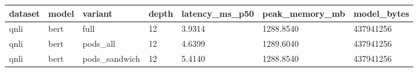 \begin{tabular}{lllllll}
\hline
dataset & model & variant & depth & latency\_ms\_p50 & peak\_memory\_mb & model\_bytes \\
\hline
qnli & bert & full & 12 & 3.9314 & 1288.8540 & 437941256 \\
qnli & bert & pods\_all & 12 & 4.6399 & 1289.6040 & 437941256 \\
qnli & bert & pods\_sandwich & 12 & 5.4140 & 1288.8540 & 437941256 \\
\hline
\end{tabular}
